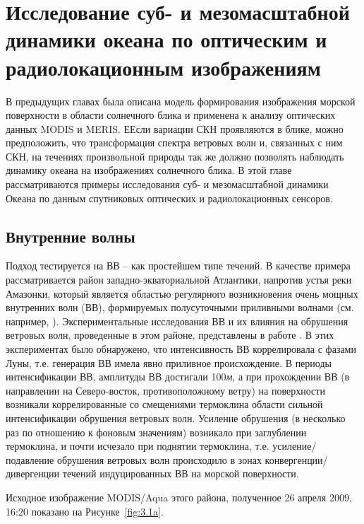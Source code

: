 \chapter{Исследование суб- и мезомасштабной динамики океана по оптическим и радиолокационным изображениям} \label{chap:3}



В предыдущих главах была описана модель формирования изображения морской поверхности в области солнечного блика и применена к анализу оптических данных MODIS и MERIS. ЕЕсли вариации СКН проявляются в блике, можно предположить, что трансформация спектра ветровых волн и, связанных с ним СКН, на течениях произвольной природы так же должно позволять наблюдать динамику океана на изображениях солнечного блика. В этой главе рассматриваются примеры исследования суб- и мезомасштабной динамики Океана по данным спутниковых оптических и радиолокационных сенсоров.



\section{Внутренние волны} \label{sec:3.1}


Подход тестируется на ВВ -- как простейшем типе течений. В качестве примера рассматривается район западно-экваториальной Атлантики, напротив устья реки Амазонки, который является областью регулярного возникновения очень мощных внутренних волн (ВВ), формируемых полусуточными приливными волнами (см. например, \citep{Ivanov1993}). Экспериментальные исследования ВВ и их влияния на обрушения ветровых волн, проведенные в этом районе, представлены в работе \citep{1986}. В этих экспериментах было обнаружено, что интенсивность ВВ коррелировала с фазами Луны, т.е. генерация ВВ имела явно приливное происхождение. В периоды интенсификации ВВ, амплитуды ВВ достигали 100\textit{м}, а при прохождении ВВ (в направлении на Северо-восток, противоположному ветру) на поверхности возникали коррелированные со смещениями термоклина области сильной интенсификации обрушения ветровых волн. Усиление обрушения (в несколько раз по отношению к фоновым значениям) возникало при заглублении термоклина, и почти исчезало при поднятии термоклина, т.е. усиление/подавление обрушения ветровых волн происходило в зонах конвергенции/дивергенции течений индуцированных ВВ на морской поверхности. 

Исходное изображение MODIS/Aqua этого района, полученное 26 апреля 2009, 16:20 показано на Рисунке~\ref{fig:3.1a}.

